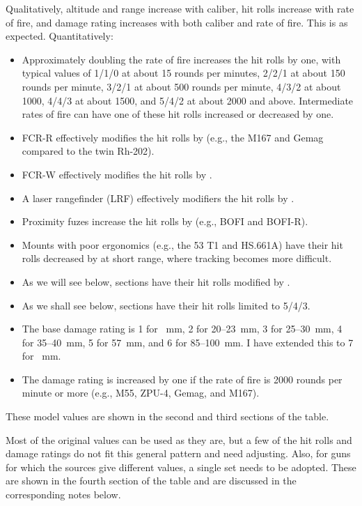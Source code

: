 {    Qualitatively, altitude and range increase with caliber, hit rolls increase with rate of fire, and damage rating increases with both caliber and rate of fire.
    This is as expected.
    Quantitatively:
    \begin{itemize}
        \item Approximately doubling the rate of fire increases the hit rolls by one, with typical values of 1/1/0 at about 15 rounds per minutes, 2/2/1 at about 150 rounds per minute, 3/2/1 at about 500 rounds per minute, 4/3/2 at about 1000, 4/4/3 at about 1500, and 5/4/2 at about 2000 and above. Intermediate rates of fire can have one of these hit rolls increased or decreased by one.
        \item FCR-R effectively modifies the hit rolls by  (e.g., the M167 and Gemag compared to the twin Rh-202).
        \item FCR-W effectively modifies the hit rolls by .
        \item A laser rangefinder (LRF) effectively modifiers the hit rolls by .
        \item Proximity fuzes increase the hit rolls by  (e.g., BOFI and BOFI-R).
        \item Mounts with poor ergonomics (e.g., the 53 T1 and HS.661A) have their hit rolls decreased by  at short range, where tracking becomes more difficult.
        \item As we will see below, sections have their hit rolls modified by .
        \item As we shall see below, sections have their hit rolls limited to 5/4/3.
        \item The base damage rating is 1 for ~mm, 2 for 20--23~mm, 3 for 25--30~mm, 4 for 35--40~mm, 5 for 57~mm, and 6 for 85--100~mm. I have extended this to 7 for ~mm.
        \item The damage rating is increased by one if the rate of fire is 2000 rounds per minute or more (e.g., M55, ZPU-4, Gemag, and M167).
    \end{itemize}
    These model values are shown in the second and third sections of the table.

    Most of the original values can be used as they are, but a few of the hit rolls and damage ratings do not fit this general pattern and need adjusting. Also, for guns for which the sources give different values, a single set needs to be adopted. These are shown in the fourth section of the table and are discussed in the corresponding notes below.

}
